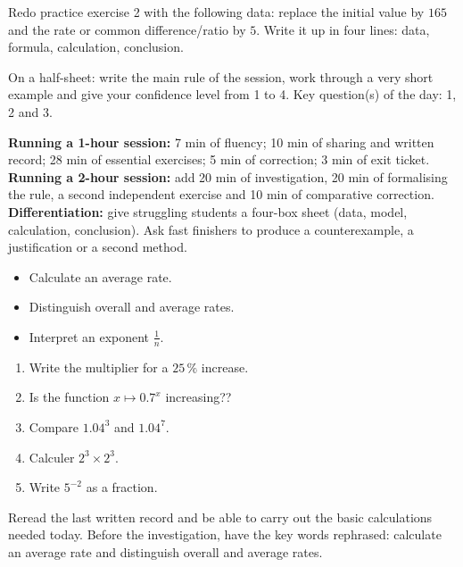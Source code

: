 
\begin{dm}Redo practice exercise 2 with the following data: replace the initial value by $165$ and the rate or common difference/ratio by $5$. Write it up in four lines: data, formula, calculation, conclusion.\end{dm}

\begin{sortie}On a half-sheet: write the main rule of the session, work through a very short example and give your confidence level from 1 to 4. Key question(s) of the day: 1, 2 and 3.\end{sortie}

\ifprof
\begin{methode}
\textbf{Running a 1-hour session:} 7 min of fluency; 10 min of sharing and written record; 28 min of essential exercises; 5 min of correction; 3 min of exit ticket.\\
\textbf{Running a 2-hour session:} add 20 min of investigation, 20 min of formalising the rule, a second independent exercise and 10 min of comparative correction.\\
\textbf{Differentiation:} give struggling students a four-box sheet (data, model, calculation, conclusion). Ask fast finishers to produce a counterexample, a justification or a second method.
\end{methode}
\fi
{}
\begin{objectifs}\begin{itemize}\item Calculate an average rate.\item Distinguish overall and average rates.\item Interpret an exponent $\frac1n$.\end{itemize}\end{objectifs}
\begin{automatismes}\begin{enumerate}\item Write the multiplier for a $25\,\%$ increase. \item Is the function $x\mapsto0.7^x$ increasing?? \item Compare $1.04^3$ and $1.04^7$. \item Calculer $2^3\times2^3$. \item Write $5^{-2}$ as a fraction. \end{enumerate}\end{automatismes}
\begin{prerequis}Reread the last written record and be able to carry out the basic calculations needed today. Before the investigation, have the key words rephrased: calculate an average rate and distinguish overall and average rates.\end{prerequis}

